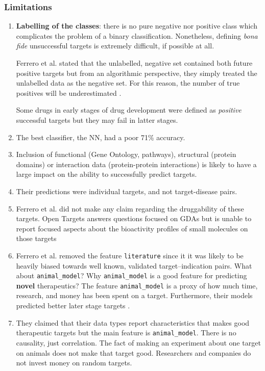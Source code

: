 \subsubsection{Limitations}
\label{subsub:limitations_openTargets}
\begin{enumerate}
    \item \textbf{Labelling of the classes}: there is no pure negative nor positive class which complicates the problem of a binary classification. Nonetheless, defining \emph{bona fide} unsuccessful targets is extremely difficult, if possible at all.
    
    Ferrero et al. \cite{ferrero2017} stated that the unlabelled, negative set contained both future positive targets but from an algorithmic perspective, they simply treated the unlabelled data as the negative set. For this reason, the number of true positives will be  underestimated \cite{ferrero2017}.
    
    Some drugs in early stages of drug development were defined as \emph{positive} successful targets but they may fail in latter stages.
    
    \item The best classifier, the NN, had a poor 71\% accuracy.
    
    \item  Inclusion of functional (Gene Ontology, pathways), structural (protein domains) or interaction data (protein-protein interactions) is likely to have a large impact on the ability to successfully predict targets.
    
    \item Their predictions were individual targets, and not target-disease pairs.
    
    \item Ferrero et al. did not make any claim regarding the druggability of these targets. Open Targets answers questions focused on GDAs but is unable to report focused aspects about the bioactivity profiles of small molecules on those targets \cite{brown2018}
    
    \item Ferrero et al. removed the feature \texttt{literature} since it it was likely to be heavily biased towards well known, validated target–indication pairs. What about \texttt{animal\_model}? Why \texttt{animal\_model} is a good feature for predicting \textbf{novel} therapeutics? The feature \texttt{animal\_model} is a proxy of how much time, research, and money has been spent on a target. Furthermore, their models predicted better later stage targets \cite{ferrero2017}.
    
    \item They claimed that their data types report characteristics that makes good therapeutic targets \cite{ferrero2017} but the main feature is \texttt{animal\_model}. There is no causality, just correlation. The fact of making an experiment about one target on animals does not make that target good. Researchers and companies do not invest money on random targets.
\end{enumerate}